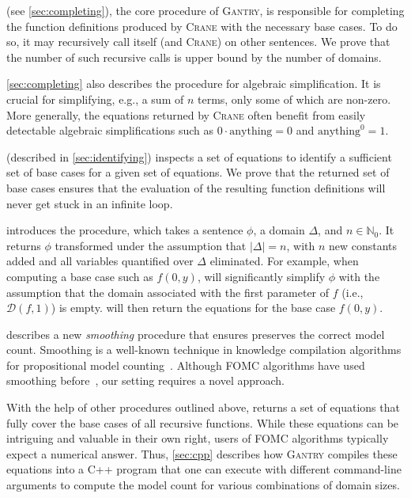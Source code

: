 \documentclass[a4paper,UKenglish,cleveref,autoref,thm-restate]{lipics-v2021}
\newcommand{\Cranetwo}{\textsc{Gantry}}
\begin{document}
\CompileWithBaseCases (see \cref{sec:completing}), the core procedure of
\Cranetwo{}, is responsible for completing the function definitions produced by
\textsc{Crane} with the necessary base cases. To do so, it may recursively call
itself (and \textsc{Crane}) on other sentences. We prove that the number of such
recursive calls is upper bound by the number of domains.

\cref{sec:completing} also describes the \Simplify procedure for algebraic
simplification. It is crucial for simplifying, e.g., a sum of $n$ terms, only
some of which are non-zero. More generally, the equations returned by
\textsc{Crane} often benefit from easily detectable algebraic simplifications
such as $0 \cdot \text{anything} = 0$ and $\text{anything}^{0} = 1$.

\FindBaseCases (described in \cref{sec:identifying}) inspects a set of equations
to identify a sufficient set of base cases for a given set of equations. We
prove that the returned set of base cases ensures that the evaluation of the
resulting function definitions will never get stuck in an infinite loop.

 introduces the \Propagate procedure, which takes a
sentence $\phi$, a domain $\Delta$, and $n \in \mathbb{N}_{0}$. It returns
$\phi$ transformed under the assumption that $|\Delta| = n$, with $n$ new
constants added and all variables quantified over $\Delta$ eliminated. For
example, when computing a base case such as $f(0, y)$, \Propagate will
significantly simplify $\phi$ with the assumption that the domain associated
with the first parameter of $f$ (i.e., $\mathcal{D}(f, 1)$) is empty.
 will then
return the equations for the base case $f(0, y)$.

 describes a new \emph{smoothing} procedure that ensures
\Propagate preserves the correct model count. Smoothing is a well-known
technique in knowledge compilation algorithms for propositional model
counting~\cite{darwiche2001tractable}. Although FOMC algorithms have used
smoothing before~\cite{DBLP:conf/ijcai/BroeckTMDR11}, our setting requires a
novel approach.

With the help of other procedures outlined above, \CompileWithBaseCases returns
a set of equations that fully cover the base cases of all recursive functions.
While these equations can be intriguing and valuable in their own right, users
of FOMC algorithms typically expect a numerical answer. Thus, \cref{sec:cpp}
describes how \Cranetwo{} compiles these equations into a C++ program that one
can execute with different command-line arguments to compute the model count for
various combinations of domain sizes.
\end{document}

